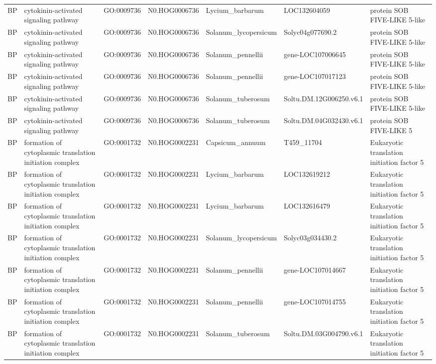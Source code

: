 \begin{table}
\begin{tabular}[t]{lllllll}
BP & cytokinin-activated signaling pathway & GO:0009736 & N0.HOG0006736 & Lycium\_barbarum & LOC132604059 & protein SOB FIVE-LIKE 5-like\\
BP & cytokinin-activated signaling pathway & GO:0009736 & N0.HOG0006736 & Solanum\_lycopersicum & Solyc04g077690.2 & protein SOB FIVE-LIKE 5-like\\
BP & cytokinin-activated signaling pathway & GO:0009736 & N0.HOG0006736 & Solanum\_pennellii & gene-LOC107006645 & protein SOB FIVE-LIKE 5-like\\
BP & cytokinin-activated signaling pathway & GO:0009736 & N0.HOG0006736 & Solanum\_pennellii & gene-LOC107017123 & protein SOB FIVE-LIKE 5-like\\
BP & cytokinin-activated signaling pathway & GO:0009736 & N0.HOG0006736 & Solanum\_tuberosum & Soltu.DM.12G006250.v6.1 & protein SOB FIVE-LIKE 5-like\\
BP & cytokinin-activated signaling pathway & GO:0009736 & N0.HOG0006736 & Solanum\_tuberosum & Soltu.DM.04G032430.v6.1 & protein SOB FIVE-LIKE 5\\
BP & formation of cytoplasmic translation initiation complex & GO:0001732 & N0.HOG0002231 & Capsicum\_annuum & T459\_11704 & Eukaryotic translation initiation factor 5\\
BP & formation of cytoplasmic translation initiation complex & GO:0001732 & N0.HOG0002231 & Lycium\_barbarum & LOC132619212 & Eukaryotic translation initiation factor 5\\
BP & formation of cytoplasmic translation initiation complex & GO:0001732 & N0.HOG0002231 & Lycium\_barbarum & LOC132616479 & Eukaryotic translation initiation factor 5\\
BP & formation of cytoplasmic translation initiation complex & GO:0001732 & N0.HOG0002231 & Solanum\_lycopersicum & Solyc03g034430.2 & Eukaryotic translation initiation factor 5\\
BP & formation of cytoplasmic translation initiation complex & GO:0001732 & N0.HOG0002231 & Solanum\_pennellii & gene-LOC107014667 & Eukaryotic translation initiation factor 5\\
BP & formation of cytoplasmic translation initiation complex & GO:0001732 & N0.HOG0002231 & Solanum\_pennellii & gene-LOC107014755 & Eukaryotic translation initiation factor 5\\
BP & formation of cytoplasmic translation initiation complex & GO:0001732 & N0.HOG0002231 & Solanum\_tuberosum & Soltu.DM.03G004790.v6.1 & Eukaryotic translation initiation factor 5\\

\end{tabular}
\end{table}
